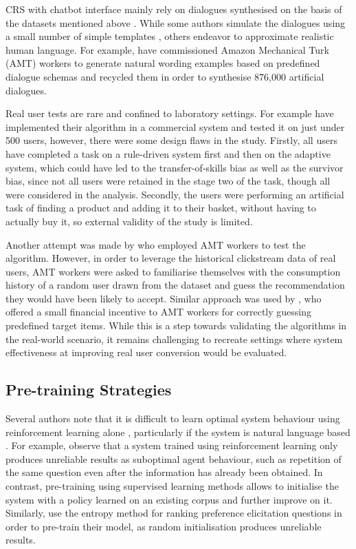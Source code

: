 CRS with chatbot interface mainly rely on dialogues synthesised on the basis of the datasets mentioned above \citep{greco2017converse, sun2018conversational}. While some authors simulate the dialogues using a small number of simple templates \citep{greco2017converse}, others endeavor to approximate realistic human language. For example, \cite{sun2018conversational} have commissioned Amazon Mechanical Turk (AMT) workers to generate natural wording examples based on predefined dialogue schemas and recycled them in order to synthesise 876,000 artificial dialogues.

Real user tests are rare and confined to laboratory settings. For example \citep{mahmood2009improving, mahmood2009learning} have implemented their algorithm in a commercial system and tested it on just under 500 users, however, there were some design flaws in the study. Firstly, all users have completed a task on a rule-driven system first and then on the adaptive system, which could have led to the transfer-of-skills bias as well as the survivor bias, since not all users were retained in the stage two of the task, though all were considered in the analysis. Secondly, the users were performing an artificial task of finding a product and adding it to their basket, without having to actually buy it, so external validity of the study is limited.

Another attempt was made by \cite{sun2018conversational} who employed AMT workers to test the algorithm. However, in order to leverage the historical clickstream data of real users, AMT workers were asked to familiarise themselves with the consumption history of a random user drawn from the dataset and guess the recommendation they would have been likely to accept. Similar approach was used by \citep{kang2019recommendation}, who offered a small financial incentive to AMT workers for correctly guessing predefined target items. While this is a step towards validating the algorithms in the real-world scenario, it remains challenging to recreate settings where system effectiveness at improving real user conversion would be evaluated.

\subsection{Pre-training Strategies}
Several authors note that it is difficult to learn optimal system behaviour using reinforcement learning alone \citep{henderson2008hybrid, sun2018conversational}, particularly if the system is natural language based \citep{greco2017converse}. For example, \cite{henderson2008hybrid} observe that a system trained using reinforcement learning only produces unreliable results as suboptimal agent behaviour, such as repetition of the same question even after the information has already been obtained. In contrast, pre-training using supervised learning methods allows to initialise the system with a policy learned on an existing corpus and further improve on it. Similarly, \cite{sun2018conversational} use the entropy method for ranking preference elicitation questions in order to pre-train their model, as random initialisation produces unreliable results. 

